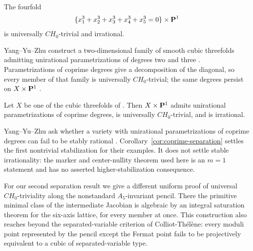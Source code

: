 \begin{corollary}[Fermat]
\label{cor:fermat-separation}
%
%
%
%
The fourfold
\[
  \{x_1^3+x_2^3+x_3^3+x_4^3+x_5^3=0\}\times\mathbf P^1
\]
is universally \(CH_0\)-trivial and irrational.
\end{corollary}

Yang--Yu--Zhu construct a two-dimensional family of smooth cubic
threefolds admitting unirational parametrizations of degrees two and three
\cite[Theorems~1.1 and 3.3]{YYZ}.  Parametrizations of coprime degrees give
a decomposition of the diagonal, so every member of that family is
universally \(CH_0\)-trivial; the same degrees persist on
\(X\times\mathbf P^1\) \cite[Corollary~3.5]{YYZ}.

\begin{corollary}
\label{cor:coprime-separation}
%
%
%
%
Let \(X\) be one of the cubic threefolds of \cite[Theorem~3.3]{YYZ}.  Then
\(X\times\mathbf P^1\) admits unirational parametrizations of coprime degrees, is
universally \(CH_0\)-trivial, and is irrational.
\end{corollary}

Yang--Yu--Zhu ask whether a variety with unirational parametrizations of
coprime degrees can fail to be stably rational \cite[Question~1.4]{YYZ}.
Corollary~\ref{cor:coprime-separation} settles the first nontrivial
stabilization for their examples.  It does not settle stable irrationality:
the marker and center-nullity theorem used here is an \(m=1\) statement and
has no asserted higher-stabilization consequence.

For our second separation result we give a different uniform proof of
universal \(CH_0\)-triviality along the nonstandard \(A_5\)-invariant
pencil.  There the primitive minimal class of the intermediate Jacobian is
algebraic by an integral saturation theorem for the six-axis lattice, for
every member at once.  This construction also reaches beyond the
separated-variable criterion of Colliot-Th\'el\`ene: every moduli point
represented by the pencil except the Fermat point fails to be projectively
equivalent to a cubic of separated-variable type.

